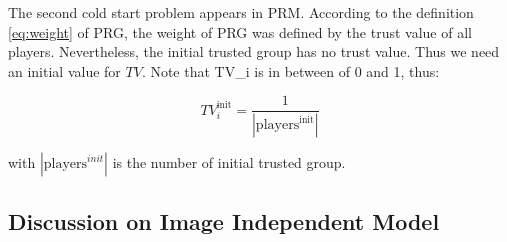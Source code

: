 The second cold start problem appears in PRM. According to the definition \ref{eq:weight} of PRG, the weight
of PRG was defined by the trust value of all players. Nevertheless, the initial trusted group has
no trust value. Thus we need an initial value for $TV$. Note that TV\_i is in between of 0 and 1, thus:

\[
TV_{i}^{\text{init}} = \frac{1}{|\text{players}^{\text{init}}|}
\]

with $|\text{players}^{init}|$ is the number of initial trusted group. 

\subsection{Discussion on Image Independent Model}

